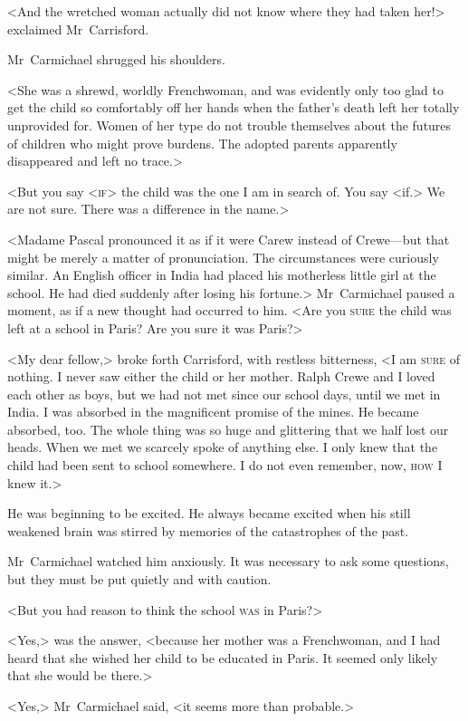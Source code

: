 <And the wretched woman actually did not know where they had taken her!> exclaimed Mr~Carrisford.

Mr~Carmichael shrugged his shoulders.

<She was a shrewd, worldly Frenchwoman, and was evidently only too glad to get the child so comfortably off her hands when the father's death left her totally unprovided for. Women of her type do not trouble themselves about the futures of children who might prove burdens. The adopted parents apparently disappeared and left no trace.>

<But you say <\textsc{if}> the child was the one I am in search of. You say <if.> We are not sure. There was a difference in the name.>

<Madame Pascal pronounced it as if it were Carew instead of Crewe—but that might be merely a matter of pronunciation. The circumstances were curiously similar. An English officer in India had placed his motherless little girl at the school. He had died suddenly after losing his fortune.> Mr~Carmichael paused a moment, as if a new thought had occurred to him. <Are you \textsc{sure} the child was left at a school in Paris? Are you sure it was Paris?>

<My dear fellow,> broke forth Carrisford, with restless bitterness, <I am \textsc{sure} of nothing. I never saw either the child or her mother. Ralph Crewe and I loved each other as boys, but we had not met since our school days, until we met in India. I was absorbed in the magnificent promise of the mines. He became absorbed, too. The whole thing was so huge and glittering that we half lost our heads. When we met we scarcely spoke of anything else. I only knew that the child had been sent to school somewhere. I do not even remember, now, \textsc{how} I knew it.>

He was beginning to be excited. He always became excited when his still weakened brain was stirred by memories of the catastrophes of the past.

Mr~Carmichael watched him anxiously. It was necessary to ask some questions, but they must be put quietly and with caution.

<But you had reason to think the school \textsc{was} in Paris?>

<Yes,> was the answer, <because her mother was a Frenchwoman, and I had heard that she wished her child to be educated in Paris. It seemed only likely that she would be there.>

<Yes,> Mr~Carmichael said, <it seems more than probable.>

